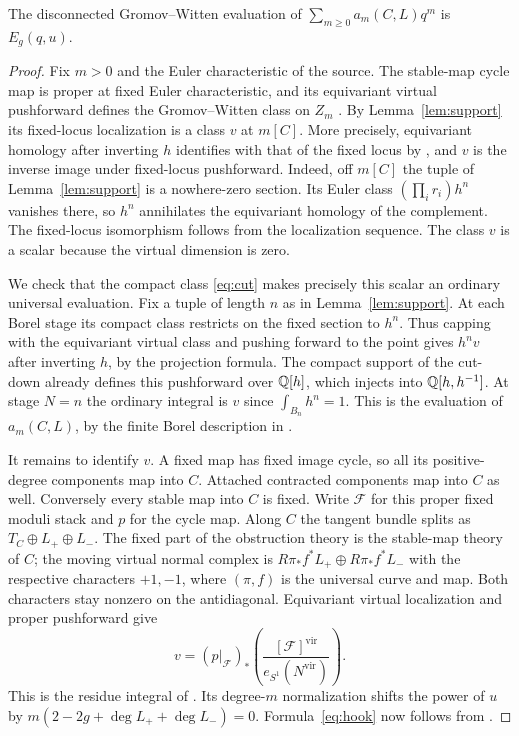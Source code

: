 \begin{proposition}\label{prop:evaluation}
The disconnected Gromov--Witten evaluation of
$\sum_{m\ge0}a_m(C,L)q^m$ is $E_g(q,u)$.
\end{proposition}
\begin{proof}
Fix $m>0$ and the Euler characteristic of the source.
The stable-map cycle map is proper at fixed Euler characteristic,
and its equivariant virtual pushforward defines the Gromov--Witten
class on $Z_m$ \cite[\S3.5, (3.21)--(3.23)]{Pardon}.
By Lemma~\ref{lem:support} its fixed-locus localization is a class
$v$ at $m[C]$. More precisely, equivariant homology after inverting
$h$ identifies with that of the fixed locus by
\cite[Proposition~4.5]{Pardon}, and $v$ is the inverse image under
fixed-locus pushforward. Indeed, off $m[C]$ the tuple of
Lemma~\ref{lem:support} is a nowhere-zero section. Its Euler
class $(\prod_i r_i)h^n$ vanishes there, so $h^n$ annihilates
the equivariant homology of the complement. The fixed-locus
isomorphism follows from the localization sequence. The class $v$
is a scalar because the virtual dimension is zero.

We check that the compact class \eqref{eq:cut} makes precisely this
scalar an ordinary universal evaluation. Fix a tuple of length $n$
as in Lemma~\ref{lem:support}. At each Borel stage its compact class
restricts on the fixed section to $h^n$. Thus capping with the
equivariant virtual class and pushing forward to the point gives
$h^n v$ after inverting $h$, by the projection formula. The compact
support of the cut-down already defines this pushforward over
$\mathbb Q[h]$, which injects into $\mathbb Q[h,h^{-1}]$. At stage $N=n$ the
ordinary integral is $v$ since $\int_{B_n}h^n=1$. This is the
evaluation of $a_m(C,L)$, by the finite Borel description in
\cite[Proposition~4.8]{Pardon}.

It remains to identify $v$. A fixed map has fixed image cycle, so
all its positive-degree components map into $C$. Attached contracted
components map into $C$ as well. Conversely every stable map into
$C$ is fixed. Write $\mathcal F$ for this proper fixed moduli stack
and $p$ for the cycle map. Along $C$ the tangent bundle splits as
$T_C\oplus L_+\oplus L_-$. The fixed part of the obstruction theory
is the stable-map theory of $C$; the moving virtual normal complex
is $R\pi_*f^*L_+\oplus R\pi_*f^*L_-$ with the respective
characters $+1,-1$, where $(\pi,f)$ is the universal curve and map.
Both characters stay nonzero on the antidiagonal. Equivariant
virtual localization and proper pushforward give
\[
 v=(p|_{\mathcal F})_*
    \left(\frac{[\mathcal F]^{\mathrm{vir}}}
    {e_{S^1}(N^{\mathrm{vir}})}\right).
\]
This is the residue integral of \cite[\S2.2]{BP}. Its degree-$m$
normalization shifts the power of $u$ by
$m(2-2g+\deg L_++\deg L_-)=0$. Formula~\eqref{eq:hook} now
follows from \cite[Corollary~7.3]{BP}.
\end{proof}

